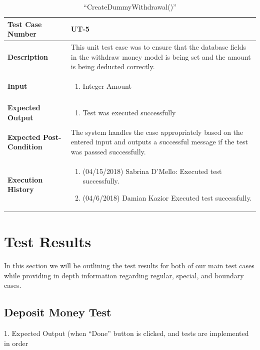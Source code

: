 \documentclass[12pt]{article}
\begin{document}
\begin{table}[H]
\caption{“CreateDummyWithdrawal()”}
\begin{center}
\begin{tabular}{|p{5.5cm}|p{11cm}|}
  \hline
  \bf Test Case Number & UT-5	\\\hline
  \bf Description & 
This unit test case was to ensure that the database fields in the withdraw money model is being set and the amount is being deducted correctly.\\\hline
  \bf Input &
  \begin{enumerate}
  \item Integer Amount
  \end{enumerate}
  \\\hline
  \bf Expected Output &
  \begin{enumerate}
  \item Test was executed successfully
  \end{enumerate}
  \\\hline
  \bf Expected Post-Condition & 
  The system handles the case appropriately based on the entered input and outputs a successful message if the test was passsed successfully.
  \\\hline   
  \bf Execution History & 
  \begin{enumerate}
  \item (04/15/2018) Sabrina D’Mello: Executed test successfully.
  \item (04/6/2018) Damian Kazior Executed test successfully.
  \end{enumerate}
  \\\hline
\end{tabular}
\end{center}
\end{table}

\section{Test Results}

In this section we will be outlining the test results for both of our main test cases while providing in depth information regarding regular, special, and boundary cases. 

\subsection{Deposit Money Test}

1. Expected Output (when ``Done'' button is clicked, and tests are implemented in order\\
\end{document}
